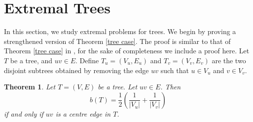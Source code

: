 \documentclass[12pt]{article}
\newtheorem{theorem}{Theorem}[section]
\begin{document}
\section{Extremal Trees}\label{extremal section}
In this section, we study extremal problems for trees. We begin by proving a strengthened version of Theorem \ref{tree case}. The proof is similar to that of Theorem \ref{tree case} in \cite{enide-geir-2024}, for the sake of completeness we include a proof here. Let $T$ be a tree, and $uv \in E$. Define $T_u=(V_u, E_u)$ and $T_v=(V_v, E_v)$ are the two disjoint subtrees obtained by removing the edge $uv$ such that $u \in V_u$ and $v \in V_v$. 
\begin{theorem}\label{extended centre edge result}
    Let $T=(V, E)$ be a tree. Let $uv \in E$. Then 
    $$
b(T)=\frac{1}{2}\left(\frac{1}{\vert V_u \vert} +\frac{1}{\vert V_v\vert} \right)
    $$
    if and only if $uv$ is a centre edge in $T$.
\end{theorem}
\end{document}
